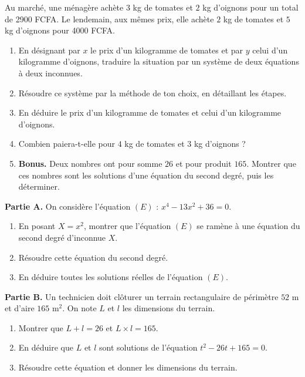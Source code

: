 \documentclass[11pt]{article}
\begin{document}
\begin{exercice}
Au marché, une ménagère achète $3$ kg de tomates et $2$ kg d'oignons pour un total de \num{2900} FCFA. Le lendemain, aux mêmes prix, elle achète $2$ kg de tomates et $5$ kg d'oignons pour \num{4000} FCFA.
\begin{enumerate}
\item En désignant par $x$ le prix d'un kilogramme de tomates et par $y$ celui d'un kilogramme d'oignons, traduire la situation par un système de deux équations à deux inconnues.
\item Résoudre ce système par la méthode de ton choix, en détaillant les étapes.
\item En déduire le prix d'un kilogramme de tomates et celui d'un kilogramme d'oignons.
\item Combien paiera-t-elle pour $4$ kg de tomates et $3$ kg d'oignons ?
\item \textbf{Bonus.} Deux nombres ont pour somme $26$ et pour produit $165$. Montrer que ces nombres sont les solutions d'une équation du second degré, puis les déterminer.
\end{enumerate}
\end{exercice}

\begin{exercice}
\textbf{Partie A.} On considère l'équation $(E)$ : $x^4 - 13x^2 + 36 = 0$.
\begin{enumerate}
\item En posant $X = x^2$, montrer que l'équation $(E)$ se ramène à une équation du second degré d'inconnue $X$.
\item Résoudre cette équation du second degré.
\item En déduire toutes les solutions réelles de l'équation $(E)$.
\end{enumerate}
\textbf{Partie B.} Un technicien doit clôturer un terrain rectangulaire de périmètre $52$ m et d'aire $165$ m$^2$. On note $L$ et $l$ les dimensions du terrain.
\begin{enumerate}
\item Montrer que $L + l = 26$ et $L \times l = 165$.
\item En déduire que $L$ et $l$ sont solutions de l'équation $t^2 - 26t + 165 = 0$.
\item Résoudre cette équation et donner les dimensions du terrain.
\end{enumerate}
\end{exercice}
\end{document}

